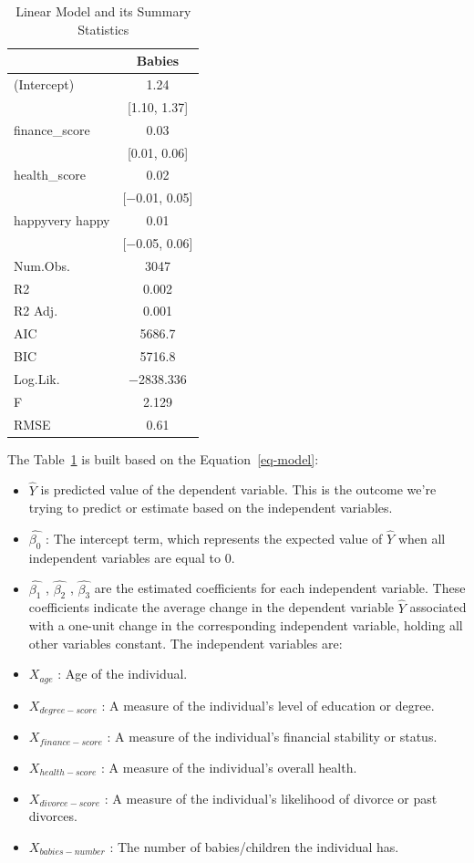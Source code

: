 \documentclass[
  letterpaper,
  DIV=11,
  numbers=noendperiod]{scrartcl}
\providecommand{\tightlist}{%
  \setlength{\itemsep}{0pt}\setlength{\parskip}{0pt}}\usepackage{longtable,booktabs,array}
\begin{document}
\hypertarget{tbl-lm}{}
\begin{table}
\caption{\label{tbl-lm}Linear Model and its Summary Statistics }\tabularnewline

\centering
\begin{tabular}[t]{lc}
\toprule
  & Babies\\
\midrule
(Intercept) & \num{1.24}\\
 & {}[\num{1.10}, \num{1.37}]\\
finance\_score & \num{0.03}\\
 & {}[\num{0.01}, \num{0.06}]\\
health\_score & \num{0.02}\\
 & {}[\num{-0.01}, \num{0.05}]\\
happyvery happy & \num{0.01}\\
 & {}[\num{-0.05}, \num{0.06}]\\
\midrule
Num.Obs. & \num{3047}\\
R2 & \num{0.002}\\
R2 Adj. & \num{0.001}\\
AIC & \num{5686.7}\\
BIC & \num{5716.8}\\
Log.Lik. & \num{-2838.336}\\
F & \num{2.129}\\
RMSE & \num{0.61}\\
\bottomrule
\end{tabular}
\end{table}

The Table~\ref{tbl-lm} is built based on the Equation~\ref{eq-model}:

\begin{itemize}
\tightlist
\item
  \(\hat{Y}\) is predicted value of the dependent variable. This is the
  outcome we're trying to predict or estimate based on the independent
  variables.
\item
  \(\hat{\beta_0}\) : The intercept term, which represents the expected
  value of \(\hat{Y}\) when all independent variables are equal to 0.
\item
  \(\hat{\beta_1}\) , \(\hat{\beta_2}\) , \(\hat{\beta_3}\) are the
  estimated coefficients for each independent variable. These
  coefficients indicate the average change in the dependent variable
  \(\hat{Y}\) associated with a one-unit change in the corresponding
  independent variable, holding all other variables constant. The
  independent variables are:
\item
  \(X_{age}\) : Age of the individual.
\item
  \(X_{degree-score}\) : A measure of the individual's level of
  education or degree.
\item
  \(X_{finance-score}\) : A measure of the individual's financial
  stability or status.
\item
  \(X_{health-score}\) : A measure of the individual's overall health.
\item
  \(X_{divorce-score}\) : A measure of the individual's likelihood of
  divorce or past divorces.
\item
  \(X_{babies-number}\) : The number of babies/children the individual
  has.
\end{itemize}
\end{document}
